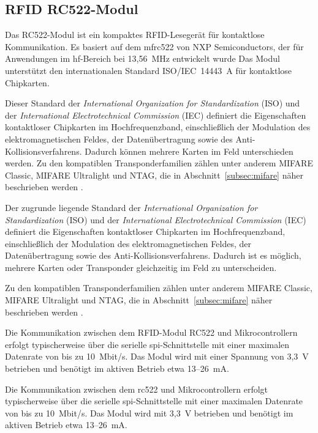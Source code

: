 \subsection{RFID RC522-Modul}

Das RC522-Modul ist ein kompaktes RFID-Lesegerät für kontaktlose Kommunikation. 
Es basiert auf dem \ac{mfrc522} von NXP Semiconductors, der für Anwendungen im \ac{hf}-Bereich bei 13,56~MHz entwickelt wurde 
Das Modul unterstützt den internationalen Standard ISO/IEC~14443~A für kontaktlose Chipkarten.
 
Dieser Standard der \emph{International Organization for Standardization} (ISO) und der \emph{International Electrotechnical Commission} (IEC) definiert die Eigenschaften kontaktloser Chipkarten im Hochfrequenzband, einschließlich der Modulation des elektromagnetischen Feldes, der Datenübertragung sowie des Anti-Kollisionsverfahrens. 
Dadurch können mehrere Karten im Feld unterschieden werden. 
Zu den kompatiblen Transponderfamilien zählen unter anderem MIFARE Classic, MIFARE Ultralight und NTAG, die in Abschnitt~\ref{subsec:mifare} näher beschrieben werden \cite{NXP:2016,Handsontec:2023}.


Der zugrunde liegende Standard der \emph{International Organization for Standardization} (ISO) und der \emph{International Electrotechnical Commission} (IEC) 
definiert die Eigenschaften kontaktloser Chipkarten im Hochfrequenzband, einschließlich der Modulation des elektromagnetischen Feldes, 
der Datenübertragung sowie des Anti-Kollisionsverfahrens. 
Dadurch ist es möglich, mehrere Karten oder Transponder gleichzeitig im Feld zu unterscheiden.


\bigskip

Zu den kompatiblen Transponderfamilien zählen unter anderem MIFARE Classic, MIFARE Ultralight und NTAG, 
die in Abschnitt~\ref{subsec:mifare} näher beschrieben werden \cite{NXP:2016,Handsontec:2023}.

Die Kommunikation zwischen dem RFID-Modul RC522 und Mikrocontrollern erfolgt typischerweise über die serielle \ac{spi}-Schnittstelle 
mit einer maximalen Datenrate von bis zu 10~Mbit/s. 
Das Modul wird mit einer Spannung von 3{,}3~V betrieben und benötigt im aktiven Betrieb etwa 13–26~mA.







Die Kommunikation zwischen dem \ac{rc522} und Mikrocontrollern erfolgt typischerweise über die serielle \ac{spi}-Schnittstelle mit einer maximalen Datenrate von bis zu 10~Mbit/s. 
Das Modul wird mit 3,3~V betrieben und benötigt im aktiven Betrieb etwa 13–26~mA. 

